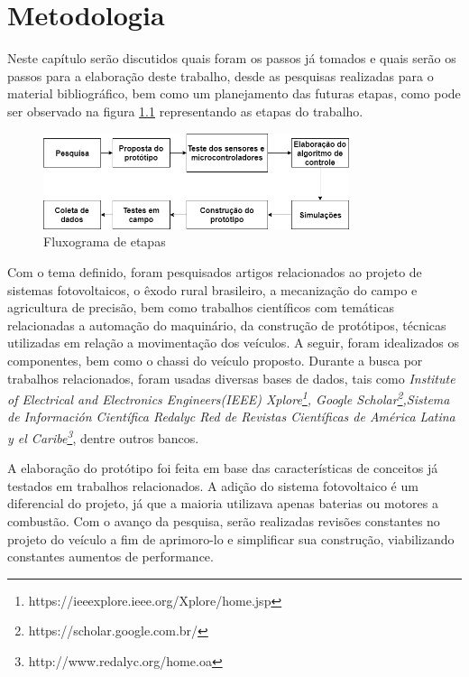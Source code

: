 \chapter{Metodologia}
\label{cap:metodologia}
Neste capítulo serão discutidos quais foram os passos já tomados e quais serão os passos para a elaboração deste trabalho, desde as pesquisas realizadas para o material bibliográfico, bem como um planejamento das futuras etapas, como pode ser observado na figura \ref{fig:metodologia:etapas} representando as etapas do trabalho. 

\begin{figure}[H]
    \centering
    \includegraphics[width=0.8\textwidth]{figuras/metodologia.png}
    \caption{Fluxograma de etapas}
    \label{fig:metodologia:etapas}
\end{figure}

Com o tema definido, foram pesquisados artigos relacionados ao projeto de sistemas fotovoltaicos, o êxodo rural brasileiro, a mecanização do campo e agricultura de precisão, bem como trabalhos científicos com temáticas relacionadas a automação do  maquinário, da construção de protótipos, técnicas utilizadas em relação a movimentação dos veículos. A seguir, foram idealizados os componentes, bem como o chassi do veículo proposto. Durante a busca por trabalhos relacionados, foram usadas diversas bases de dados, tais como  \textit{Institute of Electrical and Electronics Engineers(IEEE) Xplore\footnote{https://ieeexplore.ieee.org/Xplore/home.jsp}, Google Scholar\footnote{https://scholar.google.com.br/},Sistema de Información Científica Redalyc 
Red de Revistas Científicas de América Latina y el Caribe\footnote{http://www.redalyc.org/home.oa}}, dentre outros bancos. 

A elaboração do protótipo foi feita em base das características de conceitos já testados em trabalhos relacionados. A adição do sistema fotovoltaico é um diferencial do projeto, já que a maioria utilizava apenas baterias ou motores a combustão. Com o avanço da pesquisa, serão realizadas revisões constantes no projeto do veículo a fim de aprimoro-lo e simplificar sua construção, viabilizando constantes aumentos de performance. 

